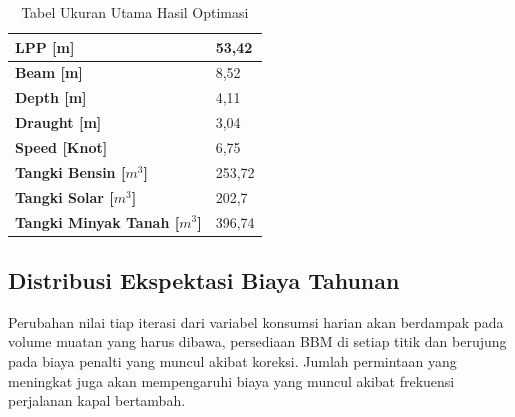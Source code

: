 \begin{table}[!ht]
    \centering
    \caption{Tabel Ukuran Utama Hasil Optimasi}
    \begin{tabular}{|l|l|}
    \hline
        \textbf{LPP [m]} & 53,42 \\ \hline
        \textbf{Beam  [m]} & 8,52 \\ \hline
        \textbf{Depth  [m]} & 4,11 \\ \hline
        \textbf{Draught [m]} & 3,04 \\ \hline
        \textbf{Speed [Knot]} & 6,75 \\ \hline
        \textbf{Tangki  Bensin [$m^3$]} & 253,72 \\ \hline
        \textbf{Tangki Solar [$m^3$]} & 202,7 \\ \hline
        \textbf{Tangki Minyak Tanah [$m^3$]} & 396,74 \\ \hline
    \end{tabular}
    \label{tabel-hasil-maindim}
\end{table}

\subsection{Distribusi Ekspektasi Biaya Tahunan}
\label{subsec:annual-cost-dist}

Perubahan nilai tiap iterasi dari variabel konsumsi harian akan berdampak pada volume muatan yang harus dibawa, persediaan BBM di setiap titik dan berujung pada biaya penalti yang muncul akibat koreksi. Jumlah permintaan yang meningkat juga akan mempengaruhi biaya yang muncul akibat frekuensi perjalanan kapal bertambah.

